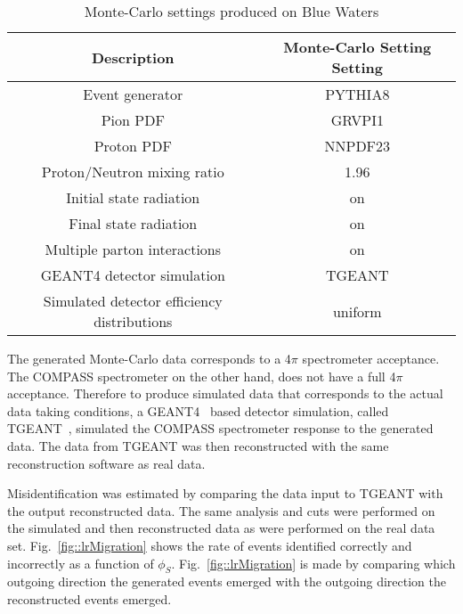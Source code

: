 \begin{table}[h!t]
  \centering
  \caption{Monte-Carlo settings produced on Blue Waters}
  \label{tab::MCproduction}
  \begin{tabular}{ |c|c| }
    \hline
    \textbf{Description}& \textbf{Monte-Carlo Setting Setting} \\ \hline
    \hline
    Event generator& PYTHIA8\\
    \hline

    Pion PDF& GRVPI1\\
    \hline

    Proton PDF& NNPDF23\\
    \hline
    
    Proton/Neutron mixing ratio& 1.96\\
    \hline

    Initial state radiation& on\\
    \hline
    
    Final state radiation& on\\
    \hline
    
    Multiple parton interactions& on\\
    \hline

    GEANT4 detector simulation& TGEANT \\
    \hline

    Simulated detector efficiency distributions& uniform\\
    \hline
    
  \end{tabular}
\end{table}

The generated Monte-Carlo data corresponds to a 4$\pi$ spectrometer acceptance.
The COMPASS spectrometer on the other hand, does not have a full 4$\pi$
acceptance.  Therefore to produce simulated data that corresponds to the actual
data taking conditions, a GEANT4~\cite{AGOSTINELLI2003250} based detector
simulation, called TGEANT~\cite{TGEANTthesis}, simulated the COMPASS
spectrometer response to the generated data.  The data from TGEANT was then
reconstructed with the same reconstruction software as real data.

Misidentification was estimated by comparing the data input to TGEANT with the
output reconstructed data.  The same analysis and cuts were performed on the
simulated and then reconstructed data as were performed on the real data set.
Fig.~\ref{fig::lrMigration} shows the rate of events identified correctly and
incorrectly as a function of $\phi_S$.  Fig.~\ref{fig::lrMigration} is made by
comparing which outgoing direction the generated events emerged with the
outgoing direction the reconstructed events emerged.

